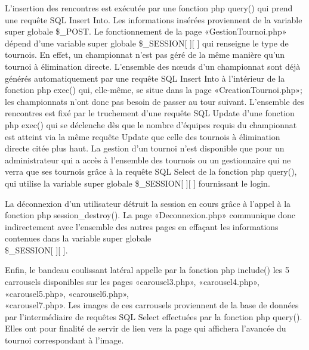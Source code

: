 \documentclass[12pt]{report}
\begin{document}
       L’insertion des rencontres est exécutée par une fonction php query() qui prend une requête SQL Insert Into. Les informations insérées proviennent de la variable super globale \$\_POST. 
       Le fonctionnement de la page «GestionTournoi.php» dépend d’une variable super globale \$\_SESSION[ ][ ] qui renseigne le type de tournois. En effet, un championnat n’est pas géré de la même manière qu’un tournoi à élimination directe. L’ensemble des nœuds d’un championnat sont déjà générés automatiquement par une requête SQL Insert Into à l’intérieur de la fonction php exec() qui, elle-même, se situe dans la page «CreationTournoi.php»; les championnats n’ont donc pas besoin de passer au tour suivant. L’ensemble des rencontres est fixé par le truchement d’une requête SQL Update d’une fonction php exec() qui se déclenche dès que le nombre d’équipes requis du championnat est atteint via la même requête Update que celle des tournois à élimination directe citée plus haut.   
       La gestion d’un tournoi n’est disponible que pour un administrateur qui a accès à l’ensemble des tournois ou un gestionnaire qui ne verra que ses tournois grâce à la requête SQL Select de la fonction php query(), qui utilise la variable super globale \$\_SESSION[ ][ ] fournissant le login.
       \bigskip
       \par
	   La déconnexion d’un utilisateur détruit la session en cours grâce à l’appel à la fonction php session\_destroy(). La page «Deconnexion.php» communique donc indirectement avec l’ensemble des autres pages en effaçant les informations contenues dans la variable super globale \\ \$\_SESSION[ ][ ].
	   \bigskip
       \par
	   Enfin, le bandeau coulissant latéral appelle par la fonction php include() les 5 carrousels disponibles sur les pages «carousel3.php», «carousel4.php», «carousel5.php», «carousel6.php»,\\ «carousel7.php».
       Les images de ces carrousels proviennent de la base de données par l’intermédiaire de requêtes SQL Select effectuées par la fonction php query(). Elles ont pour finalité de servir de lien vers la page qui affichera l’avancée du tournoi correspondant à l’image.
    
\end{document}
